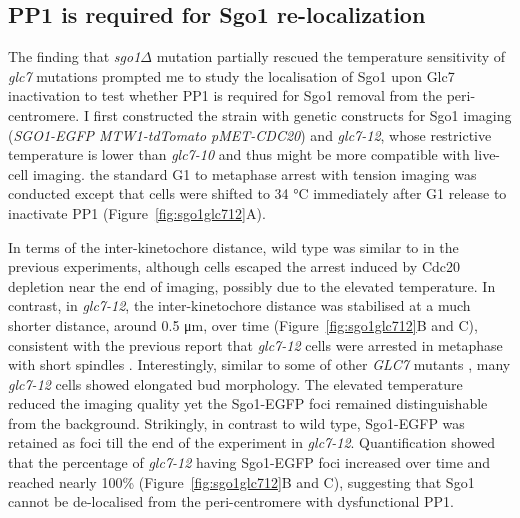 
\subsection{PP1 is required for Sgo1 re-localization}

The finding that \textit{sgo1$\Delta$} mutation partially rescued the temperature sensitivity of \textit{glc7} mutations prompted me to study the localisation of Sgo1 upon Glc7 inactivation to test whether PP1 is required for Sgo1 removal from the peri-centromere. I first constructed the strain with genetic constructs for Sgo1 imaging (\textit{SGO1-EGFP MTW1-tdTomato pMET-CDC20}) and \textit{glc7-12}, whose restrictive temperature is lower than \textit{glc7-10} and thus might be more compatible with live-cell imaging. the standard G1 to metaphase arrest with tension imaging was conducted except that cells were shifted to 34 \si{\celsius} immediately after G1 release to inactivate PP1 (Figure~\ref{fig:sgo1glc712}A). 

In terms of the inter-kinetochore distance, wild type was similar to in the previous experiments, although cells escaped the arrest induced by Cdc20 depletion near the end of imaging, possibly due to the elevated temperature. In contrast, in \textit{glc7-12}, the inter-kinetochore distance was stabilised at a much shorter distance, around 0.5 \si{\micro\metre}, over time (Figure~\ref{fig:sgo1glc712}B and C), consistent with the previous report that \textit{glc7-12} cells were arrested in metaphase with short spindles \citep{MacKelvie1995ThePhosphatase}. Interestingly, similar to some of other \textit{GLC7} mutants \citep{Black1995A1, Andrews2000TypeCerevisiae}, many \textit{glc7-12} cells showed elongated bud morphology. The elevated temperature reduced the imaging quality yet the Sgo1-EGFP foci remained distinguishable from the background. Strikingly, in contrast to wild type, Sgo1-EGFP was retained as foci till the end of the experiment in \textit{glc7-12}. Quantification showed that the percentage of \textit{glc7-12} having Sgo1-EGFP foci increased over time and reached nearly 100\% (Figure~\ref{fig:sgo1glc712}B and C), suggesting that Sgo1 cannot be de-localised from the peri-centromere with dysfunctional PP1. 


